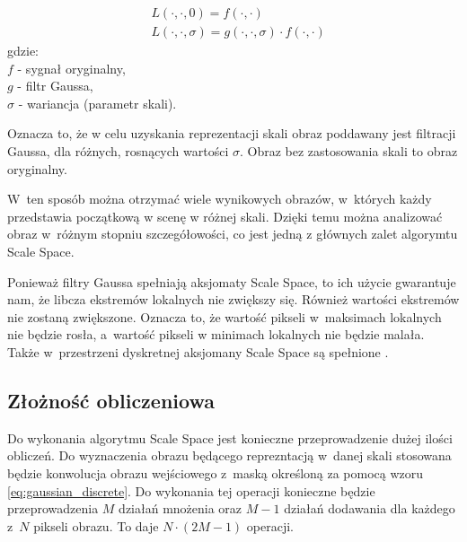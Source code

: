 \begin{equation}
\label{eq:scalespace}
\begin{split}
& L(\cdot,\cdot,0) = f(\cdot,\cdot) \\
& L(\cdot,\cdot,\sigma) = g(\cdot,\cdot,\sigma)\cdot f(\cdot,\cdot)
\end{split}
\end{equation}
gdzie:\\
$ f $ - sygnał oryginalny, \\
$ g $ - filtr Gaussa, \\
$ \sigma $ - wariancja (parametr skali).

Oznacza to, że w celu uzyskania reprezentacji skali obraz poddawany jest filtracji Gaussa, dla różnych, rosnących wartości $ \sigma $. Obraz bez zastosowania skali to obraz oryginalny.

W~ten sposób można otrzymać wiele wynikowych obrazów, w~których każdy przedstawia początkową w scenę w różnej skali. Dzięki temu można analizować obraz w~różnym stopniu szczegółowości, co jest jedną z głównych zalet algorymtu Scale Space.

Ponieważ filtry Gaussa spełniają aksjomaty Scale Space, to ich użycie gwarantuje nam, że libcza ekstremów lokalnych nie zwiększy się. Również wartości ekstremów nie zostaną zwiększone. Oznacza to, że wartość pikseli w~maksimach lokalnych nie będzie rosła, a~wartość pikseli w minimach lokalnych nie będzie malała. Także w~przestrzeni dyskretnej aksjomany Scale Space są spełnione \cite{SSFDS}.


\subsection{Złożność obliczeniowa}
\label{subsec:zlozonosc_obliczeniowa}

Do wykonania algorytmu Scale Space jest konieczne przeprowadzenie dużej ilości obliczeń. Do wyznaczenia obrazu będącego reprezntacją w~danej skali stosowana będzie konwolucja obrazu wejściowego z~maską określoną za pomocą wzoru \ref{eq:gaussian_discrete}. Do wykonania tej operacji konieczne będzie przeprowadzenia $ M $ działań mnożenia oraz $ M - 1 $ działań dodawania dla każdego z~$N$ pikseli obrazu. To daje $ N \cdot (2M - 1) $ operacji.

